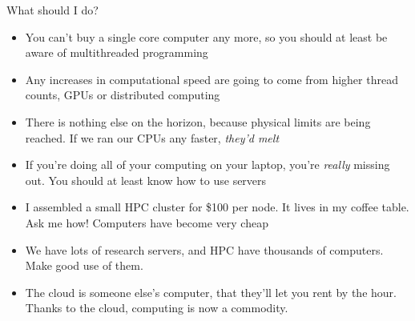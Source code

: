 \documentclass{beamer}
\begin{document}
\begin{frame}{What should I do?}
	\begin{itemize}
\item You can't buy a single core computer any more, so you should at least be aware of multithreaded programming
\item Any increases in computational speed are going to come from higher thread counts, GPUs or distributed computing
\item There is nothing else on the horizon, because physical limits are being reached. If
	we ran our CPUs any faster, \emph{they'd melt} 
\item If you're doing all of your computing on your laptop, you're \emph{really}
	missing out. You should at least know how to use servers
\item I assembled a small HPC cluster for \$100 per node. It lives in my coffee table. Ask me how! Computers have become very cheap
\item We have lots of research servers, and HPC have thousands of computers. Make good use of
	them.
\item The cloud is someone else's computer, that they'll let you rent by the hour. Thanks to the cloud, computing is now a commodity.
	\end{itemize}
\end{frame}
\end{document}
